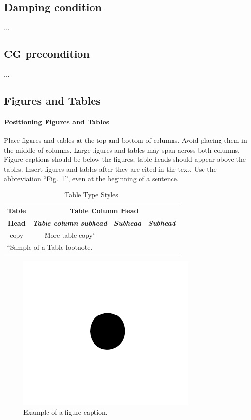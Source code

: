 \documentclass[conference]{IEEEtran}
\begin{document}
\subsection{Damping condition}
...

\subsection{CG precondition}
...

\subsection{Figures and Tables}
\paragraph{Positioning Figures and Tables} Place figures and tables at the top and 
bottom of columns. Avoid placing them in the middle of columns. Large 
figures and tables may span across both columns. Figure captions should be 
below the figures; table heads should appear above the tables. Insert 
figures and tables after they are cited in the text. Use the abbreviation 
``Fig.~\ref{fig}'', even at the beginning of a sentence.

\begin{table}[htbp]
\caption{Table Type Styles}
\begin{center}
\begin{tabular}{|c|c|c|c|}
\hline
\textbf{Table}&\multicolumn{3}{|c|}{\textbf{Table Column Head}} \\
\cline{2-4} 
\textbf{Head} & \textbf{\textit{Table column subhead}}& \textbf{\textit{Subhead}}& \textbf{\textit{Subhead}} \\
\hline
copy& More table copy$^{\mathrm{a}}$& &  \\
\hline
\multicolumn{4}{l}{$^{\mathrm{a}}$Sample of a Table footnote.}
\end{tabular}
\label{tab1}
\end{center}
\end{table}

\begin{figure}[htbp]
\centerline{\includegraphics{fig1.png}}
\caption{Example of a figure caption.}
\label{fig}
\end{figure}
\end{document}
